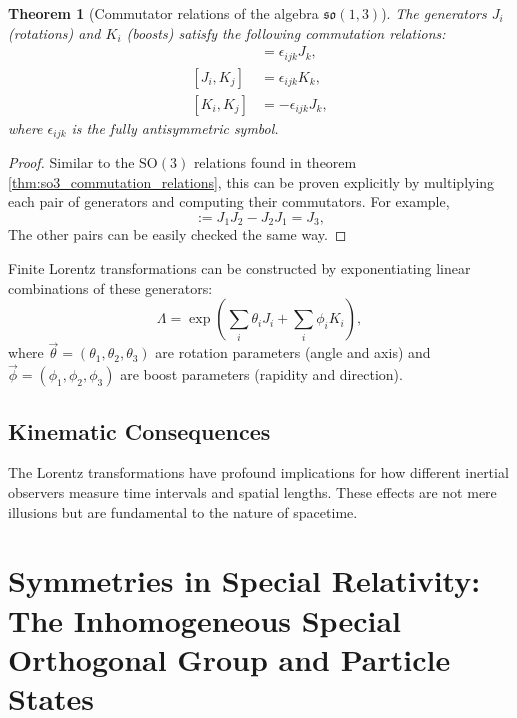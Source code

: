\documentclass{amsart}
\newtheorem{theorem}{Theorem}[section]
\theoremstyle{definition}
\theoremstyle{remark}
\begin{document}
\begin{theorem}[Commutator relations of the algebra $\mathfrak{so}(1,3)$]\label{thm:so13_algebra_commutation_relations}
  The generators $J_i$ (rotations) and $K_i$ (boosts) satisfy the following commutation relations:
  \begin{align*}
    [J_i, J_j] &= \epsilon_{ijk} J_k, \\
    [J_i, K_j] &= \epsilon_{ijk} K_k, \\
    [K_i, K_j] &= -\epsilon_{ijk} J_k,
  \end{align*}
  where $\epsilon_{ijk}$ is the fully antisymmetric symbol.
\end{theorem}
\begin{proof}
    Similar to the $\mathrm{SO}(3)$ relations found in theorem \ref{thm:so3_commutation_relations}, this can be proven explicitly by multiplying each pair of generators and computing their commutators.
  For example,
  \begin{equation*}
    [J_1, J_2] := J_1 J_2 - J_2 J_1 = J_3,
  \end{equation*}
  The other pairs can be easily checked the same way.
\end{proof}

Finite Lorentz transformations can be constructed by exponentiating linear combinations of these generators:
\begin{equation*}
  \Lambda = \exp\left(\sum_i \theta_i J_i + \sum_i \phi_i K_i \right),
\end{equation*}
where $\vec{\theta} = (\theta_1, \theta_2, \theta_3)$ are rotation parameters (angle and axis) and $\vec{\phi} = (\phi_1, \phi_2, \phi_3)$ are boost parameters (rapidity and direction).

\subsection{Kinematic Consequences}
\label{subsec:sr_kinematics}
The Lorentz transformations have profound implications for how different inertial observers measure time intervals and spatial lengths.
These effects are not mere illusions but are fundamental to the nature of spacetime.

\section{Symmetries in Special Relativity: The Inhomogeneous Special Orthogonal Group and Particle States}
\label{sec:poincare_particle_states}
\end{document}
